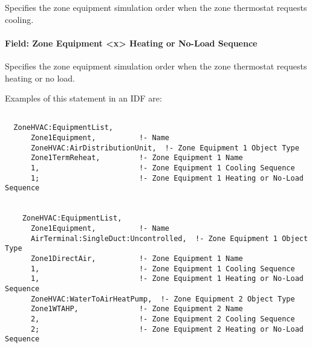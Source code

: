 Specifies the zone equipment simulation order when the zone thermostat requests cooling.

\paragraph{Field: Zone Equipment \textless{}x\textgreater{} Heating or No-Load Sequence}\label{field-zone-equipment-x-heating-or-no-load-sequence}

Specifies the zone equipment simulation order when the zone thermostat requests heating or no load.

Examples of this statement in an IDF are:

\begin{lstlisting}

  ZoneHVAC:EquipmentList,
      Zone1Equipment,          !- Name
      ZoneHVAC:AirDistributionUnit,  !- Zone Equipment 1 Object Type
      Zone1TermReheat,         !- Zone Equipment 1 Name
      1,                       !- Zone Equipment 1 Cooling Sequence
      1;                       !- Zone Equipment 1 Heating or No-Load Sequence


    ZoneHVAC:EquipmentList,
      Zone1Equipment,          !- Name
      AirTerminal:SingleDuct:Uncontrolled,  !- Zone Equipment 1 Object Type
      Zone1DirectAir,          !- Zone Equipment 1 Name
      1,                       !- Zone Equipment 1 Cooling Sequence
      1,                       !- Zone Equipment 1 Heating or No-Load Sequence
      ZoneHVAC:WaterToAirHeatPump,  !- Zone Equipment 2 Object Type
      Zone1WTAHP,              !- Zone Equipment 2 Name
      2,                       !- Zone Equipment 2 Cooling Sequence
      2;                       !- Zone Equipment 2 Heating or No-Load Sequence
\end{lstlisting}

